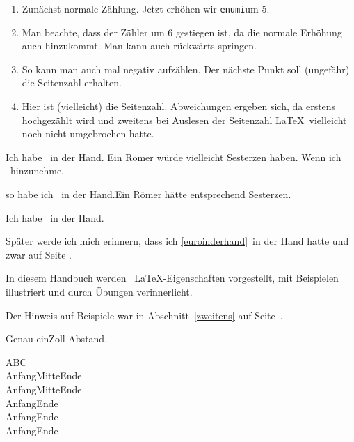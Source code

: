 \documentclass[a4paper, 12pt]{article} %
\newcounter{zahlA}%
\newcounter{zahlB}%
\begin{document}

\begin{enumerate}\item Zunächst normale Zählung. Jetzt erhöhen wir 
    \texttt{enumi}um 5.\addtocounter{enumi}{5}\item
    Man beachte, dass der Zähler um 6 gestiegen ist, da die normale
    Erhöhung auch hinzukommt. Man kann auch rückwärts springen.
    \addtocounter{enumi}{-10}\item So kann man auch mal negativ aufzählen.
     Der nächste Punkt
     soll (ungefähr) die Seitenzahl erhalten.
     \item Hier ist (vielleicht) die Seitenzahl. 
     Abweichungen ergeben
     sich, da erstens hochgezählt wird und zweitens bei Auslesen der
     Seitenzahl \LaTeX\ vielleicht noch nicht umgebrochen hatte.
\end{enumerate}

\setcounter{zahlA}{10}
\setcounter{zahlB}{70}

Ich habe \EUR~in der Hand. Ein Römer würde vielleicht
 Sesterzen haben. Wenn ich \EUR~hinzunehme,
 \addtocounter{zahlA}{\value{zahlB}}so 
 habe ich \EUR~in der Hand.Ein Römer hätte entsprechend
  Sesterzen.

 \setcounter{zahlA}{4}Ich habe \label{euroinderhand}%
 \EUR~in der Hand.\par Später werde ich mich erinnern, dass ich 
 \ref{euroinderhand}\EUR~in der Hand hatte und zwar auf Seite 
 \pageref{euroinderhand}.


 In diesem Handbuch werden
 \thezahlA\ \LaTeX-Eigenschaften vorgestellt,
 \thezahlA\label{zweitens} mit Beispielen
 illustriert und
 \thezahlA{} durch Übungen verinnerlicht.\par
 Der Hinweis auf Beispiele war in Abschnitt~\ref{zweitens} auf
 Seite~\pageref{zweitens}.

 \makeatletter\p@zahlA\thezahlA

 Genau ein\hspace{1in}Zoll Abstand.


 A\hfill BC\\
 Anfang\hfill Mitte\hfill Ende\\
 Anfang\dotfill Mitte\hrulefill Ende\\
 Anfang\dotfill\hfil\hrulefill Ende\\
 Anfang\dotfill\hfill\hrulefill Ende\\
 Anfang\dotfill\hspace{0pt plus 1filll}\hrulefill Ende
\end{document}
